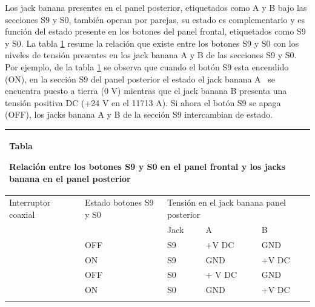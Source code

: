Los jack banana presentes en el panel posterior, etiquetados como A y B bajo las secciones S9 y S0, también operan por parejas, su estado es complementario y es función del estado presente en los botones del panel frontal, etiquetados como S9 y S0. La tabla \ref{seq:refTable3} resume la relación que existe entre los botones S9 y S0 con los niveles de	tensión presentes en los jack banana A y B de las secciones S9 y S0. Por ejemplo, de la tabla \ref{seq:refTable3} se	observa que cuando el botón S9 esta encendido (ON), en la sección S9 del panel posterior el estado el jack banana A
\ se encuentra puesto a tierra (0 V) mientras que el jack banana B presenta una tensión positiva DC (+24 V en el 11713 A). Si ahora el botón S9 se apaga (OFF), los jacks banana A y B de la sección S9 intercambian de estado.

\begin{table}
	\centering
	\begin{tabular}{m{2.0cm}|m{2.5019999cm}|m{1.6099999cm}|m{1.694cm}|m{1.583cm}|}
		
		\multicolumn{5}{m{10.189cm}}{{\centering Tabla {{Table}\theTable\label{seq:refTable3}}\par}
			
			\centering Relación entre los botones S9 y S0 en el panel frontal y los jacks banana en el panel posterior}\\\hline
		\multicolumn{1}{|m{2.0cm}|}{\centering Interruptor coaxial} &
		\centering Estado botones S9 y S0 &
		\multicolumn{3}{m{5.287cm}|}{\centering Tensión en el jack banana panel posterior}\\\hline
		&
		&
		\centering Jack &
		\centering A &
		\centering\arraybslash B\\\hhline{~~---}
		\multicolumn{1}{|m{2.0cm}|}{\centering S9} &
		\centering OFF &
		\centering S9  &
		\centering +V DC &
		\centering\arraybslash GND \\\hline
		&
		\centering ON &
		\centering S9 &
		\centering GND  &
		\centering\arraybslash +V DC\\\hhline{~----}
		\multicolumn{1}{|m{2.0cm}|}{\centering S0} &
		\centering OFF &
		\centering S0  &
		\centering + V DC &
		\centering\arraybslash GND\\\hline
		&
		\centering ON &
		\centering S0  &
		\centering GND  &
		\centering\arraybslash +V DC\\\hhline{~----}\end{tabular}
	
\end{table}

